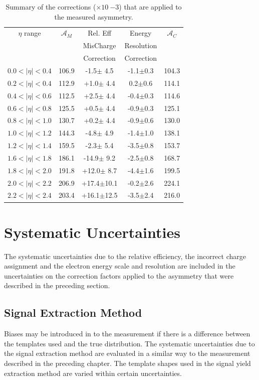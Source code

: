 \begin{table}[htbp]
  \begin{center}
    \begin{tabular}{ccccc}
\toprule
$\eta$ range & $\mathcal{A}_M$ & Rel. Eff & Energy & $\mathcal{A}_C$ \\
& & MisCharge & Resolution &  \\
& & Correction  & Correction & \\
\midrule
 $0.0<|\eta|<0.4$ & 106.9 &-1.5$\pm$ 4.5 & -1.1$\pm$0.3 & 104.3\\ 
 $0.2<|\eta|<0.4$ & 112.9 &+1.0$\pm$ 4.4 &  0.2$\pm$0.6 & 114.1\\ 
 $0.4<|\eta|<0.6$ & 112.5 &+2.5$\pm$ 4.4 & -0.4$\pm$0.3 & 114.6\\
 $0.6<|\eta|<0.8$ & 125.5 &+0.5$\pm$ 4.4 & -0.9$\pm$0.3 & 125.1\\ 
 $0.8<|\eta|<1.0$ & 130.7 &+0.2$\pm$ 4.4 & -0.9$\pm$0.6 & 130.0\\ 
 $1.0<|\eta|<1.2$ & 144.3 &-4.8$\pm$ 4.9 & -1.4$\pm$1.0 & 138.1\\ 
 $1.2<|\eta|<1.4$ & 159.5 &-2.3$\pm$ 5.4 & -3.5$\pm$0.8 & 153.7\\ 
 $1.6<|\eta|<1.8$ & 186.1 &-14.9$\pm$ 9.2 & -2.5$\pm$0.8 & 168.7\\
 $1.8<|\eta|<2.0$ & 191.8 &+12.0$\pm$ 8.7 & -4.4$\pm$1.6 & 199.5\\
 $2.0<|\eta|<2.2$ & 206.9 &+17.4$\pm$10.1&  -0.2$\pm$2.6 & 224.1\\
 $2.2<|\eta|<2.4$ & 203.4 &+16.1$\pm$12.5 & -3.5$\pm$2.4 & 216.0\\
\bottomrule
    \end{tabular}
    \caption{\label{tab:correctionfactors}Summary of the corrections ($\times
10~{-3}$) that are applied to the measured asymmetry\cite{bendavid2011electron}.}
  \end{center}
\end{table}


\section{Systematic Uncertainties}
The systematic uncertainties due to the relative efficiency, the incorrect
charge assignment and the electron energy scale and resolution are included in
the uncertainties on the correction factors applied to the asymmetry that were
described in the preceding section.

\subsection{Signal Extraction Method}
Biases may be introduced in to the measurement if there is a
difference between the \ETm templates used and the true \ETm distribution. 
The systematic uncertainties due to the signal extraction method are evaluated
in a similar way to the measurement described in the preceding chapter.  The
template shapes used in the signal yield extraction method are varied within
certain uncertainties. 

